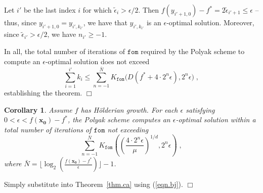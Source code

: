 \documentclass[reqno, 11pt]{amsart}
\newtheorem{cor}[prop]{Corollary}
\numberwithin{equation}{section}
\newcommand{\shrink}[1]{ {\scriptstyle {\textstyle {#1} } } }
\newcommand{\smfrac}[2]{ \shrink{ \frac{#1}{#2} } }
\newcommand{\fom}{\mathtt{fom}}
\begin{document}
Let $ i' $ be the last index $ i $ for which $ \tilde{\epsilon}_i > \epsilon/2 $. Then $ f(y_{i'+1,0}) - f^* = 2 \tilde{\epsilon}_{i' + 1} \leq \epsilon $ -- thus, since $ y_{i'+1,0} = y_{i',k_{i'}} $, we have that $y_{i',k_{i'}} $ is an $ \epsilon $-optimal solution. Moreover, since $ \tilde{\epsilon}_{i'} > \epsilon/2 $, we have $ n_{i'} \geq -1 $.

In all, the total number of iterations of $ \fom $ required by the Polyak scheme to compute an $ \epsilon $-optimal solution does not exceed
\[    \sum_{i=1}^{i'} k_i \leq \sum_{n=-1}^{\bar{N}} K_{\fom} \big(   D(f^* + 4 \cdot 2^n \epsilon), 2^n \epsilon \big)  \; , \]
establishing the theorem. \hfill $ \Box $

 
\begin{cor} \label{cor.cb} 
Assume $ f $ has H\"{o}lderian growth.
 For each $ \epsilon $ satisfying $ 0 < \epsilon  < f( \mathbf{x_0}) - f^*  $, the Polyak scheme computes an $ \epsilon $-optimal solution within a total number of iterations of $ \fom $ not exceeding  
\begin{equation}  \label{eqn.cd}
  \sum_{n=-1}^{ \bar{N}} K_{\fom} \left( \left( \smfrac{4 \cdot 2^n \epsilon }{\mu} \right)^{1/d}, 2^n \epsilon \right) \; , 
  \end{equation} 
where $ \bar{N} = \lfloor \log_2 \left(  \frac{f( \mathbf{x_0}) - f^*}{\epsilon} \right) \rfloor - 1 $. 
\end{cor}
  Simply substitute into Theorem~\ref{thm.ca}  using (\ref{eqn.bj}). \hfill $ \Box $
\end{document}
